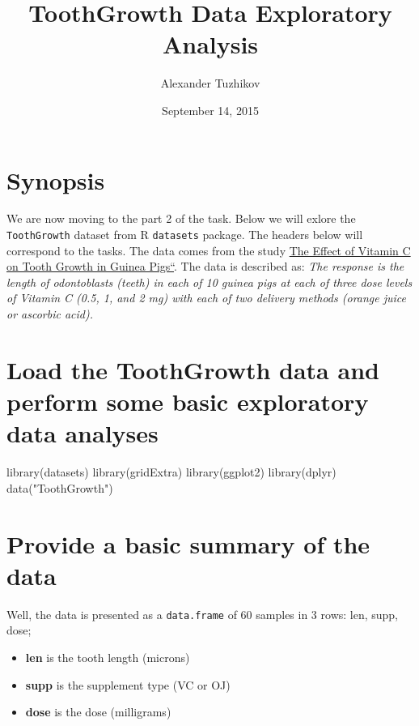 \documentclass[]{article}
\title{ToothGrowth Data Exploratory Analysis}
\author{Alexander Tuzhikov}
\date{September 14, 2015}
\newenvironment{Shaded}{}{}
\newcommand{\KeywordTok}[1]{\textcolor[rgb]{0.00,0.00,1.00}{{#1}}}
\newcommand{\StringTok}[1]{\textcolor[rgb]{0.00,0.50,0.50}{{#1}}}
\newcommand{\NormalTok}[1]{{#1}}
\providecommand{\tightlist}{%
  \setlength{\itemsep}{0pt}\setlength{\parskip}{0pt}}
\begin{document}
\maketitle

\section{Synopsis}\label{synopsis}

We are now moving to the part 2 of the task. Below we will exlore the
\texttt{ToothGrowth} dataset from R \texttt{datasets} package. The
headers below will correspond to the tasks. The data comes from the
study \href{http://jn.nutrition.org/content/33/5/491.full.pdf}{The
Effect of Vitamin C on Tooth Growth in Guinea Pigs``}. The data is
described as: \emph{The response is the length of odontoblasts (teeth)
in each of 10 guinea pigs at each of three dose levels of Vitamin C
(0.5, 1, and 2 mg) with each of two delivery methods (orange juice or
ascorbic acid).}

\section{Load the ToothGrowth data and perform some basic exploratory
data
analyses}\label{load-the-toothgrowth-data-and-perform-some-basic-exploratory-data-analyses}

\begin{Shaded}
\begin{Highlighting}[]
\KeywordTok{library}\NormalTok{(datasets)}
\KeywordTok{library}\NormalTok{(gridExtra)}
\KeywordTok{library}\NormalTok{(ggplot2)}
\KeywordTok{library}\NormalTok{(dplyr)}
\KeywordTok{data}\NormalTok{(}\StringTok{"ToothGrowth"}\NormalTok{)}
\end{Highlighting}
\end{Shaded}

\section{Provide a basic summary of the
data}\label{provide-a-basic-summary-of-the-data}

Well, the data is presented as a \texttt{data.frame} of 60 samples in 3
rows: len, supp, dose;

\begin{itemize}
\tightlist
\item
  \textbf{len} is the tooth length (microns)
\item
  \textbf{supp} is the supplement type (VC or OJ)
\item
  \textbf{dose} is the dose (milligrams)
\end{itemize}
\end{document}
